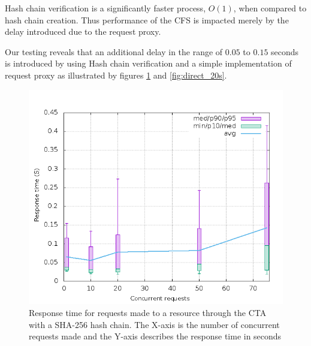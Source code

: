 \documentclass[a4paper,twoside]{article}
\begin{document}
Hash chain verification is a significantly faster process, $O(1)$, when compared to hash chain creation. Thus performance of the CFS is impacted merely by the delay introduced due to the request proxy. 

Our testing reveals that an additional delay in the range of $0.05$ to $0.15$ seconds is introduced by using Hash chain verification and a simple implementation of request proxy as illustrated by figures \ref{fig:verify_20s} and \ref{fig:direct_20s}.

\begin{figure}[h]
\includegraphics[width=\columnwidth]{verify_20s}
\caption{Response time for requests made to a resource through the CTA with a SHA-256 hash chain. The X-axis is the number of concurrent requests made and the Y-axis describes the response time in seconds}
\label{fig:verify_20s}
\end{figure}
\end{document}
